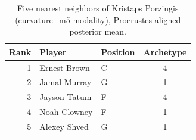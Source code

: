 \begin{table}[htbp]
  \centering\small
  \begin{tabular}{rllc}
    \toprule
    Rank & Player & Position & Archetype \\
    \midrule
    1 & Ernest Brown & C & 4 \\
    2 & Jamal Murray & G & 1 \\
    3 & Jayson Tatum & F & 4 \\
    4 & Noah Clowney & F & 1 \\
    5 & Alexey Shved & G & 1 \\
    \bottomrule
  \end{tabular}
  \caption{Five nearest neighbors of Kristaps Porzingis (curvature_m5 modality), Procrustes-aligned posterior mean.}
  \label{tab:Kristaps_Porzingis_neighbors_curvature_m5}
\end{table}

